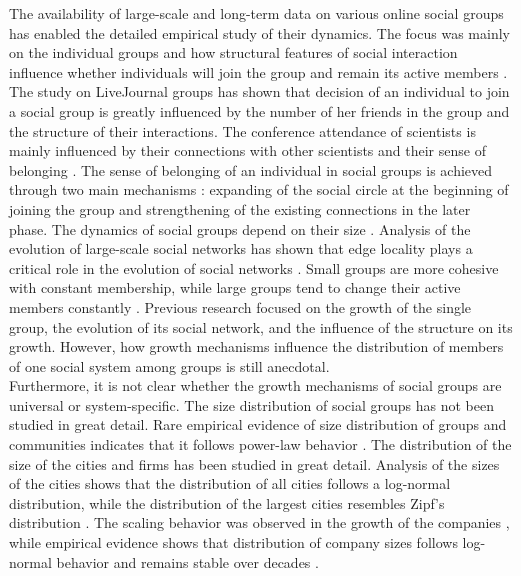 The availability of large-scale and long-term data on various online social groups has enabled the detailed empirical study of their dynamics. The focus was mainly on the individual groups and how structural features of social interaction influence whether individuals will join the group \cite{backstrom2006group} and remain its active members \cite{smiljanic2016theoretical, smiljanic2017associative}. The study on LiveJournal \cite{backstrom2006group} groups has shown that decision of an individual to join a social group is greatly influenced by the number of her friends in the group and the structure of their interactions. The conference attendance of scientists is mainly influenced by their connections with other scientists and their sense of belonging \cite{smiljanic2016theoretical}. The sense of belonging of an individual in social groups is achieved through two main mechanisms \cite{smiljanic2017associative}: expanding of the social circle at the beginning of joining the group and strengthening of the existing connections in the later phase. The dynamics of social groups depend on their size \cite{}. Analysis of the evolution of large-scale social networks has shown that edge locality plays a critical role in the evolution of social networks \cite{leskovec2008microscopic}. Small groups are more cohesive with constant membership, while large groups tend to change their active members constantly \cite{PNAS}. Previous research focused on the growth of the single group, the evolution of its social network, and the influence of the structure on its growth. However, how growth mechanisms influence the distribution of members of one social system among groups is still anecdotal.\\

Furthermore, it is not clear whether the growth mechanisms of social groups are universal or system-specific. The size distribution of social groups has not been studied in great detail. Rare empirical evidence of size distribution of groups and communities indicates that it follows power-law behavior \cite{}.  The distribution of the size of the cities and firms has been studied in great detail. Analysis of the sizes of the cities shows that the distribution of all cities follows a log-normal distribution, while the distribution of the largest cities resembles Zipf's distribution \cite{fazio2015pareto}. The scaling behavior was observed in the growth of the companies \cite{stanley1996scaling}, while empirical evidence shows that distribution of company sizes follows log-normal behavior and remains stable over decades \cite{amaral1997scaling}. 

